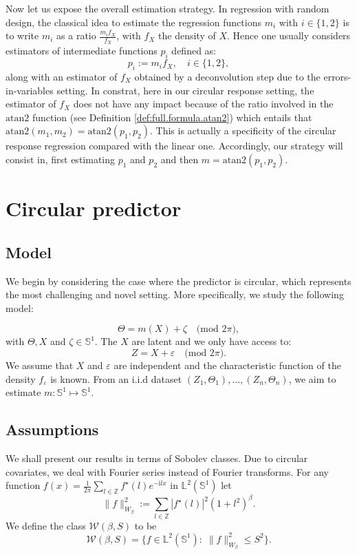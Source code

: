 \documentclass[11pt,a4paper,openany]{article}
\newcommand{\Atan}{\mbox{atan2}}
\def\Z{\mathbb{Z}}
\def\S{\mathbb{S}}
\def \compi{\mathrm{i}}
\begin{document}
Now let us expose the overall estimation strategy.  In regression with random design, the classical idea to estimate the regression functions $m_i$ with $i \in \{1,2\}$ is to write $m_i$ as a ratio $\frac{m_{i} f_{X}}{f_X}$, with $f_X$ the density of $X$. Hence one usually considers estimators of intermediate functions $p_i$ defined as:
$$p_{i} :=  m_{i}    f_{X}, \quad i \in \{1,2\}, $$
along with an estimator of $f_{X}$ obtained by a deconvolution step due to the errors-in-variables setting.  In constrat, here in our circular response setting, the estimator of $f_X$ does not have any impact because of the ratio involved in the $\Atan$ function (see Definition \ref{def:full.formula.atan2}) which entails that $\Atan(m_1, m_2)= \Atan(p_1,p_2)$. This is actually a specificity of the circular response regression compared with the linear one. Accordingly,  our strategy will consist in, first estimating $p_1$ and $p_2$ and then $m=\Atan(p_1,p_2)$.
 
 \section{Circular predictor}\label{section-circular}
 
 \subsection{Model}
We begin by considering the case where the predictor is circular, which represents the most challenging and novel setting. More specifically, we study the following  model:

$$
\Theta= m(X) + \zeta   \quad  \textrm{(mod $2\pi$)},
$$
with $\Theta, X$ and $ \zeta \in \mathbb{S}^1$. The $X$ are latent and we only have access to:
$$
Z = X + \varepsilon \quad  \textrm{(mod $2\pi$)}.
$$
 We assume that  $X$ and $\varepsilon$ are independent and  the characteristic function of the density $f_\varepsilon$ is known.  From an i.i.d dataset $(Z_1, \Theta_1), \dots, (Z_n,\Theta_n)  $, we aim to estimate $m: \mathbb{S}^1 \mapsto \mathbb{S}^1$.


\subsection{Assumptions}
We shall present our results in terms of Sobolev classes. Due to circular covariates, we deal with Fourier series instead of Fourier transforms. For any function  $f(x)= \frac{1}{2\pi} \sum_{l \in \mathbb{Z}} f^{\star}(l) e^{-\compi l x}$ in $ \mathbb{L}^2(\S^1)$ let 
$$
\| f\|^2_{{W}_\beta} := \sum_{l \in \Z} |f^\star(l)|^2 (1+l^2)^\beta.
$$
We define the class $\mathcal{W}(\beta, S)$ to be 
\begin{equation}
\mathcal{W}(\beta, S)= \{ f  \in  \mathbb{L}^2(\S^1): \; \| f\|^2_{W_\beta} \leq S^2 \}.
\end{equation}
\end{document}
